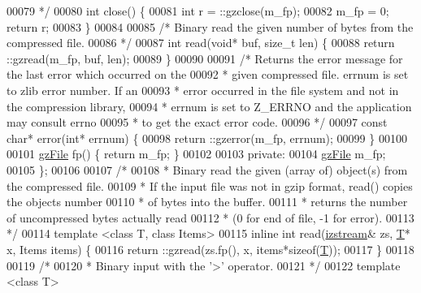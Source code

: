 \begin{DoxyCode}
00079 \textcolor{comment}{         */}
00080         \textcolor{keywordtype}{int} close() \{
00081             \textcolor{keywordtype}{int} r = ::gzclose(m\_fp);
00082             m\_fp = 0; \textcolor{keywordflow}{return} r;
00083         \}
00084 
00085         \textcolor{comment}{/* Binary read the given number of bytes from the compressed file.}
00086 \textcolor{comment}{         */}
00087         \textcolor{keywordtype}{int} read(\textcolor{keywordtype}{void}* buf, \textcolor{keywordtype}{size\_t} len) \{
00088             return ::gzread(m\_fp, buf, len);
00089         \}
00090 
00091         \textcolor{comment}{/* Returns the error message for the last error which occurred on the}
00092 \textcolor{comment}{         * given compressed file. errnum is set to zlib error number. If an}
00093 \textcolor{comment}{         * error occurred in the file system and not in the compression library,}
00094 \textcolor{comment}{         * errnum is set to Z\_ERRNO and the application may consult errno}
00095 \textcolor{comment}{         * to get the exact error code.}
00096 \textcolor{comment}{         */}
00097         \textcolor{keyword}{const} \textcolor{keywordtype}{char}* error(\textcolor{keywordtype}{int}* errnum) \{
00098             return ::gzerror(m\_fp, errnum);
00099         \}
00100 
00101         \hyperlink{structgz_file__s}{gzFile} fp() \{ \textcolor{keywordflow}{return} m\_fp; \}
00102 
00103     \textcolor{keyword}{private}:
00104         \hyperlink{structgz_file__s}{gzFile} m\_fp;
00105 \};
00106 
00107 \textcolor{comment}{/*}
00108 \textcolor{comment}{ * Binary read the given (array of) object(s) from the compressed file.}
00109 \textcolor{comment}{ * If the input file was not in gzip format, read() copies the objects number}
00110 \textcolor{comment}{ * of bytes into the buffer.}
00111 \textcolor{comment}{ * returns the number of uncompressed bytes actually read}
00112 \textcolor{comment}{ * (0 for end of file, -1 for error).}
00113 \textcolor{comment}{ */}
00114 \textcolor{keyword}{template} <\textcolor{keyword}{class} T, \textcolor{keyword}{class} Items>
00115 \textcolor{keyword}{inline} \textcolor{keywordtype}{int} read(\hyperlink{classizstream}{izstream}& zs, \hyperlink{group___sparse_core___module_class_eigen_1_1_triplet}{T}* x, Items items) \{
00116     return ::gzread(zs.fp(), x, items*\textcolor{keyword}{sizeof}(\hyperlink{group___sparse_core___module_class_eigen_1_1_triplet}{T}));
00117 \}
00118 
00119 \textcolor{comment}{/*}
00120 \textcolor{comment}{ * Binary input with the '>' operator.}
00121 \textcolor{comment}{ */}
00122 \textcolor{keyword}{template} <\textcolor{keyword}{class} T>

\end{DoxyCode}
